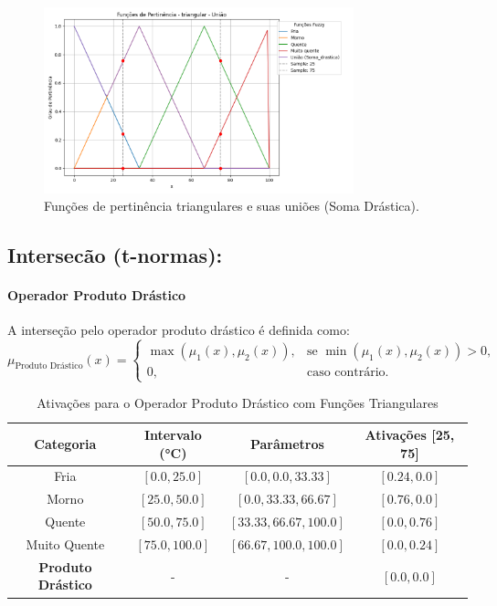 \documentclass[a4paper,12pt]{article}
\begin{document}
\begin{figure}[H]
    \centering
    \includegraphics[width=0.8\textwidth]{img/funções_de_pertinência_triangular_união_fuzzificado.png}
    \caption{Funções de pertinência triangulares e suas uniões (Soma Drástica).}
    \label{fig:uniao_soma_drastica_triangular}
\end{figure}

\subsection{Intersecão (t-normas):}

\paragraph{Operador Produto Drástico}

A interseção pelo operador produto drástico é definida como:
\[
\mu_{\text{Produto Drástico}}(x) =
\begin{cases}
\max(\mu_1(x), \mu_2(x)), & \text{se } \min(\mu_1(x), \mu_2(x)) > 0, \\
0, & \text{caso contrário.}
\end{cases}
\]

\begin{table}[H]
\centering
\caption{Ativações para o Operador Produto Drástico com Funções Triangulares}
\begin{tabular}{|c|c|c|c|}
\hline
\textbf{Categoria}    & \textbf{Intervalo (°C)} & \textbf{Parâmetros}       & \textbf{Ativações [25, 75]} \\ \hline
Fria                  & $[0.0, 25.0]$          & $[0.0, 0.0, 33.33]$       & $[0.24, 0.0]$              \\ \hline
Morno                 & $[25.0, 50.0]$         & $[0.0, 33.33, 66.67]$     & $[0.76, 0.0]$              \\ \hline
Quente                & $[50.0, 75.0]$         & $[33.33, 66.67, 100.0]$   & $[0.0, 0.76]$              \\ \hline
Muito Quente          & $[75.0, 100.0]$        & $[66.67, 100.0, 100.0]$   & $[0.0, 0.24]$              \\ \hline
\textbf{Produto Drástico} & -     & -                         & $[0.0, 0.0]$              \\ \hline
\end{tabular}
\end{table}
\end{document}
